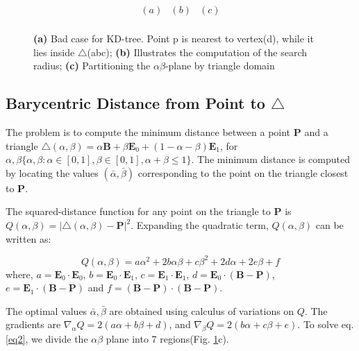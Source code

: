 \documentclass[11pt]{article}
\newcommand{\EB}{\mathbf{E}}
\newcommand{\PB}{\mathbf{P}}
\newcommand{\BB}{\mathbf{B}}
\begin{document}
\begin{figure}[hbt]
\begin{center}
\[\begin{array}{ccc}
  (a) & (b) & (c) \\
 \end{array} \]
\end{center}
\vspace{-20pt}
  \caption{{\bf(a)} Bad case for KD-tree. Point p is nearest to vertex(d), while it lies inside $\triangle$(abc); {\bf(b)} Illustrates the computation of the search radius; {\bf(c)} Partitioning the $\alpha\beta$-plane by triangle domain}
  \label{fig1}
\end{figure}

 \subsection{Barycentric Distance from Point to $\triangle$} 
 The problem is to compute the minimum distance between a point $\PB$ and a triangle $\triangle(\alpha,\beta) = \alpha \BB + \beta \EB_0 + (1-\alpha-\beta) \EB_1$, for $\alpha, \beta \{ \alpha, \beta : \alpha \in [0,1], \beta \in [0,1], \alpha + \beta \le 1 \}$. The minimum distance is computed by locating the values $(\bar{\alpha}, \bar{\beta})$ corresponding to the point on the triangle closest to $\PB$. \cite{PT}
 
\par The squared-distance function for any point on the triangle to $\mathbf{P}$ is $Q(\alpha,\beta) = |\triangle(\alpha,\beta) - \PB |^2$. Expanding the quadratic term, $Q(\alpha,\beta)$ can be written as:

\begin{equation}
  Q(\alpha,\beta) = a \alpha^2 + 2b\alpha\beta + c\beta^2 + 2d\alpha + 2e\beta + f
  \label{eq2}
\end{equation}
where, $a = \EB_0 \cdot \EB_0$, $b = \EB_0 \cdot \EB_1$, $c = \EB_1 \cdot \EB_1$, $d = \EB_0 \cdot (\BB - \PB)$, $e = \EB_1 \cdot (\BB - \PB)$ and $f = (\BB - \PB) \cdot (\BB - \PB)$.
 
The optimal values $\bar{\alpha},\bar{\beta}$ are obtained using calculus of variations on $Q$. The gradients are $\nabla_\alpha Q = 2(a\alpha + b\beta + d)$, and $\nabla_\beta Q =  2(b\alpha + c\beta + e)$. To solve eq. \ref{eq2}, we divide the $\alpha\beta$ plane into 7 regions(Fig. \ref{fig1}c). 
\end{document}
